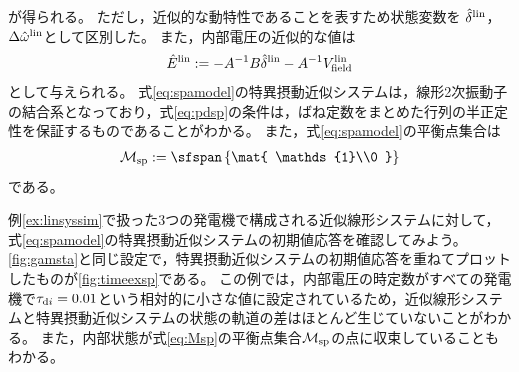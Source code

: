 \documentclass[tombow,dvipdfmx]{corona-a5}
\begin{document}
が得られる。
ただし，近似的な動特性であることを表すため状態変数を
$\hat{\delta}^{\rm lin}$，
$\Delta \hat{\omega}^{\rm lin}$として区別した。
また，内部電圧の近似的な値は
\begin{align*}
\hat{E}^{\rm lin}:=  -A^{-1} B \hat{\delta}^{\rm lin}
- A^{-1} V^{\rm lin}_{\rm field}
\end{align*}
として与えられる。
式\ref{eq:spamodel}の特異摂動近似システムは，線形2次振動子の結合系となっており，式\ref{eq:pdsp}の条件は，ばね定数をまとめた行列の半正定性を保証するものであることがわかる。
また，式\ref{eq:spamodel}の平衡点集合は
\begin{align}\label{eq:Msp}
\mathcal{M}_{\rm sp} := \sfspan 
\left\{
\mat{ \mathds{1}\\0 }
\right\}
\end{align}
である。

\begin{例}[特異摂動近似システムの初期値応答]
例\ref{ex:linsyssim}で扱った3つの発電機で構成される近似線形システムに対して，式\ref{eq:spamodel}の特異摂動近似システムの初期値応答を確認してみよう。
\ref{fig:gamsta}と同じ設定で，特異摂動近似システムの初期値応答を重ねてプロットしたものが\ref{fig:timeexsp}である。
この例では，内部電圧の時定数がすべての発電機で$\tau_{{\rm d}i}=0.01$という相対的に小さな値に設定されているため，近似線形システムと特異摂動近似システムの状態の軌道の差はほとんど生じていないことがわかる。
また，内部状態が式\ref{eq:Msp}の平衡点集合$\mathcal{M}_{\rm sp}$の点に収束していることもわかる。
\end{例}
\end{document}
